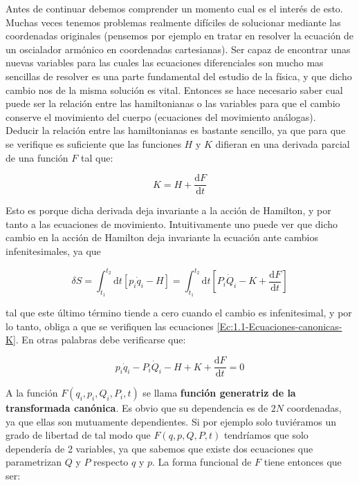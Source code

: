 \documentclass[12pt,a4paper]{article}
\numberwithin{equation}{section}
\numberwithin{figure}{section}
\newcommand{\ccorchetes}[1]{\left[ #1  \right]}
\newcommand{\D}{\mathrm{d}}
\newcommand{\derivadas}[2]{\frac{\D #1}{\D #2}}
\begin{document}
Antes de continuar debemos comprender un momento cual es el interés de esto. Muchas veces tenemos problemas realmente difíciles de solucionar mediante las coordenadas originales (pensemos por ejemplo en tratar en resolver la ecuación de un oscialador armónico en coordenadas cartesianas). Ser capaz de encontrar unas nuevas variables para las cuales las ecuaciones diferenciales son mucho mas sencillas de resolver es una parte fundamental del estudio de la física, y que dicho cambio nos de la misma solución es vital. Entonces se hace necesario saber cual puede ser la relación entre las hamiltonianas o las variables para que el cambio conserve el movimiento del cuerpo (ecuaciones del movimiento análogas). \\

Deducir la relación entre las hamiltonianas es bastante sencillo, ya que para que se verifique es suficiente que las funciones $H$ y $K$ difieran en una derivada parcial de una función $F$ tal que:

\begin{equation}
K = H + \derivadas{F}{t} \label{Ec:1.1-K-H}
\end{equation}

Esto es porque dicha derivada deja invariante a la acción de Hamilton, y por tanto a las ecuaciones de movimiento. Intuitivamente uno puede ver que dicho cambio en la acción de Hamilton deja invariante la ecuación ante cambios infenitesimales, ya que

\begin{equation}
\delta S = \int_{t_1}^{t_2} \D t \ccorchetes{p_i \dot{q}_i - H} = \int_{t_1}^{t_2} \D t \ccorchetes{P_i \dot{Q}_i - K + \dfrac{\D F}{\D t}} 
\end{equation}

tal que este último término tiende a cero cuando el cambio es infenitesimal, y por lo tanto, obliga a que se verifiquen las ecuaciones \ref{Ec:1.1-Ecuaciones-canonicas-K}. En otras palabras debe verificarse que:

\begin{equation}
p_i \dot{q}_i - P_i \dot{Q}_i - H + K + \dfrac{\D F}{\D t} = 0 \label{Ec:1.1-K-H2}
\end{equation}


 A la función $F(q_i,p_i,Q_i,P_i,t)$ se llama \textbf{función generatriz de la transformada canónica}. Es obvio que su dependencia es de $2N$ coordenadas, ya que ellas  son mutuamente dependientes. Si por ejemplo solo tuviéramos un grado de libertad de tal modo que $F(q,p,Q,P,t)$ tendríamos que solo dependería de 2 variables, ya que sabemos que existe dos ecuaciones que parametrizan $Q$ y $P$ respecto $q$ y $p$. La forma funcional de $F$ tiene entonces que ser:
\end{document}
